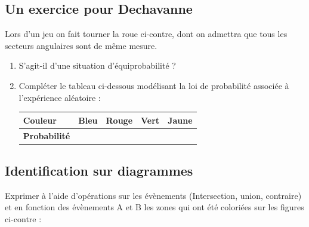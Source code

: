 \documentclass[oneside,12pt]{article}          %
\begin{document}
\subsection{Un exercice pour Dechavanne}
\begin{minipage}{0.25\linewidth}
\end{minipage}
\begin{minipage}{0.75\linewidth}
	Lors d'un jeu on fait tourner la roue ci-contre, dont on admettra que tous les secteurs angulaires sont de même mesure.
	\begin{enumerate}
		\item S'agit-il d'une situation d'équiprobabilité ?
		\item Compléter le tableau ci-dessous modélisant la loi de probabilité associée à l'expérience aléatoire :
		
		\renewcommand{\arraystretch}{1.75}
		\begin{tabular}{| P{3cm} | P{2cm} | P{2cm} | P{2cm} | P{2cm} |} \hline
			 \textbf{Couleur} & Bleu & Rouge & Vert & Jaune \\ \hline
			 \textbf{Probabilité} & & & & \\ \hline
		\end{tabular}
	\end{enumerate}
\end{minipage}



\subsection{Identification sur diagrammes}
Exprimer à l'aide d'opérations sur les évènements (Intersection, union, contraire) et en fonction des évènements A et B les zones qui ont été coloriées sur les figures ci-contre :
\end{document}
